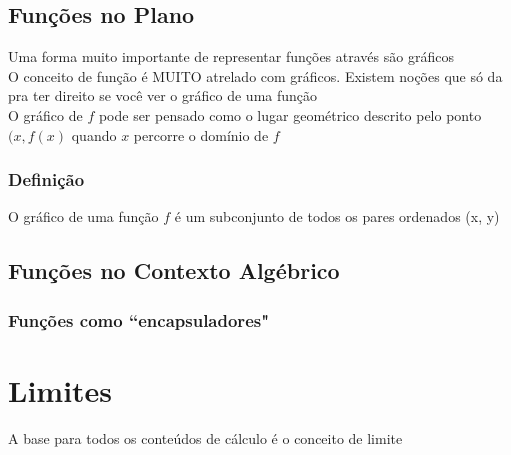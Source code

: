 \documentclass{article}
\begin{document}
\subsection{Funções no Plano}
Uma forma muito importante de representar funções através são gráficos
\\[2pt]
O conceito de função é MUITO atrelado com gráficos. Existem noções que só da pra ter direito se você ver o gráfico de uma função
\\[5pt]
O gráfico de $f$ pode ser pensado como o lugar geométrico descrito pelo ponto $(x, f(x)$ quando $x$ percorre o domínio de $f$

\subsubsection{Definição}
O gráfico de uma função $f$ é um subconjunto de todos os pares ordenados (x, y)

\subsection{Funções no Contexto Algébrico}

\subsubsection{Funções como ``encapsuladores"}

\section{Limites}
A base para todos os conteúdos de cálculo é o conceito de limite
\end{document}
